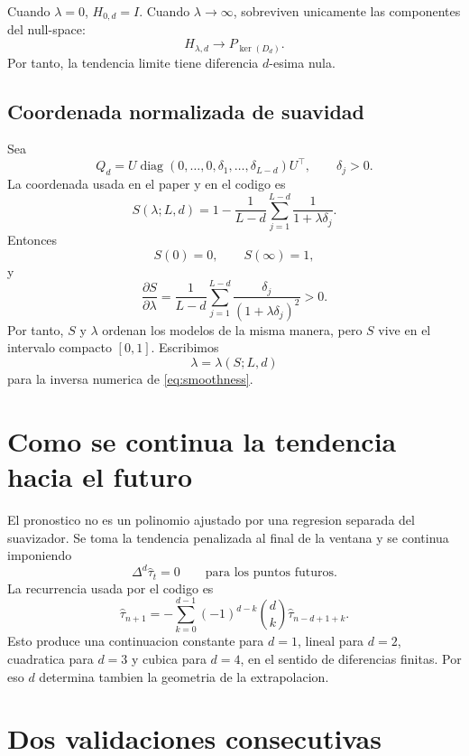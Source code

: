 \documentclass[11pt]{article}
\newcommand{\D}{\Delta}
\begin{document}
Cuando \(\lambda=0\), \(H_{0,d}=I\). Cuando \(\lambda\to\infty\), sobreviven
unicamente las componentes del null-space:
\[
H_{\lambda,d}\longrightarrow P_{\ker(D_d)}.
\]
Por tanto, la tendencia limite tiene diferencia \(d\)-esima nula.

\subsection{Coordenada normalizada de suavidad}

Sea
\[
Q_d
=
U\operatorname{diag}
(0,\ldots,0,\delta_1,\ldots,\delta_{L-d})U^\top,
\qquad \delta_j>0.
\]
La coordenada usada en el paper y en el codigo es
\begin{equation}
S(\lambda;L,d)
=
1-
\frac{1}{L-d}
\sum_{j=1}^{L-d}
\frac{1}{1+\lambda\delta_j}.
\label{eq:smoothness}
\end{equation}
Entonces
\[
S(0)=0,
\qquad
S(\infty)=1,
\]
y
\begin{equation}
\frac{\partial S}{\partial\lambda}
=
\frac{1}{L-d}
\sum_{j=1}^{L-d}
\frac{\delta_j}{(1+\lambda\delta_j)^2}
>0.
\label{eq:smonotone}
\end{equation}
Por tanto, \(S\) y \(\lambda\) ordenan los modelos de la misma manera, pero
\(S\) vive en el intervalo compacto \([0,1]\). Escribimos
\[
\lambda=\lambda(S;L,d)
\]
para la inversa numerica de \eqref{eq:smoothness}.

\section{Como se continua la tendencia hacia el futuro}

El pronostico no es un polinomio ajustado por una regresion separada del
suavizador. Se toma la tendencia penalizada al final de la ventana y se
continua imponiendo
\begin{equation}
\D^d\widehat{\tau}_t=0
\qquad
\text{para los puntos futuros}.
\label{eq:zero-difference}
\end{equation}
La recurrencia usada por el codigo es
\begin{equation}
\widehat{\tau}_{n+1}
=
-
\sum_{k=0}^{d-1}
(-1)^{d-k}
\binom{d}{k}
\widehat{\tau}_{n-d+1+k}.
\label{eq:continuation}
\end{equation}
Esto produce una continuacion constante para \(d=1\), lineal para \(d=2\),
cuadratica para \(d=3\) y cubica para \(d=4\), en el sentido de diferencias
finitas. Por eso \(d\) determina tambien la geometria de la extrapolacion.

\section{Dos validaciones consecutivas}
\end{document}
